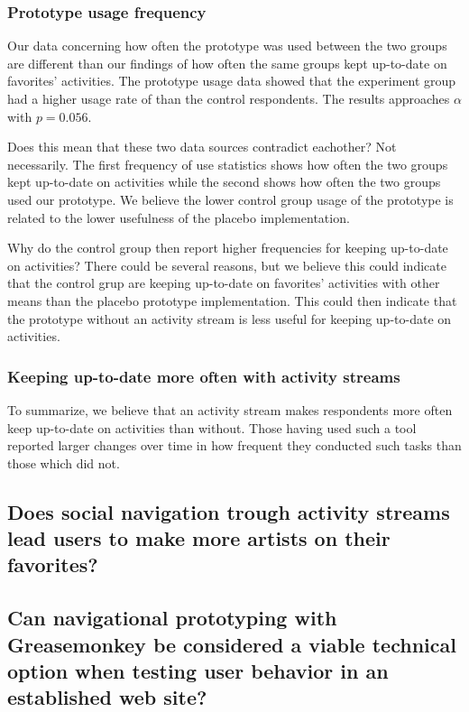 \subsubsection{Prototype usage frequency}

Our data concerning how often the prototype was used between the two groups%
are different than our findings of how often the same groups kept up-to-date
on favorites' activities. The prototype usage data showed that the experiment
group had a higher usage rate of \latest{} than the control respondents. The
results approaches $\alpha$ with $p = 0.056$.

Does this mean that these two data sources contradict eachother? Not
necessarily. The first frequency of use statistics shows how often the two
groups kept up-to-date on activities while the second shows how often
the two groups used our prototype. We believe the lower control group usage of
the prototype is related to the lower usefulness of the placebo
implementation.

Why do the control group then report higher frequencies for keeping up-to-date
on activities? There could be several reasons, but we believe this could
indicate that the control grup are keeping up-to-date on favorites' activities
with other means than the placebo prototype implementation. This could then
indicate that the prototype without an activity stream is less useful
for keeping up-to-date on activities.

\subsubsection{Keeping up-to-date more often with activity streams}

To summarize, we believe that an activity stream makes respondents
more often keep up-to-date on activities than without. Those having used such
a tool reported larger changes over time in how frequent they conducted such
tasks than those which did not.

\subsection{%
  Does social navigation trough activity streams lead users to make
  more artists on \urort{} their favorites?
}

\subsection{%
  Can navigational prototyping with Greasemonkey be considered a
  viable technical option when testing user behavior in an
  established web site?
}

